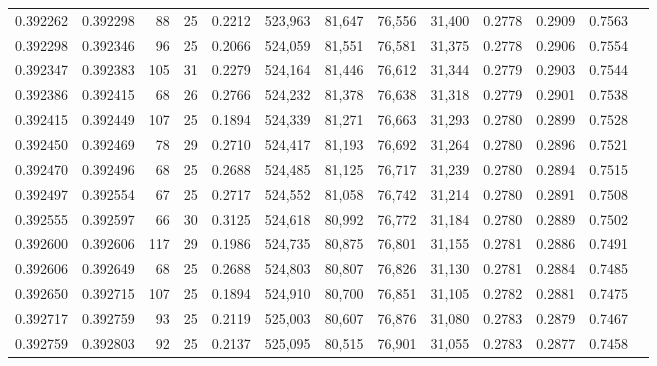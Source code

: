 \begin{tabular}{rrrrrrrrrrrrr}
0.392262 & 0.392298 &    88 &  25 &                                     0.2212 & 523,963 &  81,647 &  76,556 &  31,400 & 0.2778 & 0.2909 & 0.7563 \\
0.392298 & 0.392346 &    96 &  25 &                                     0.2066 & 524,059 &  81,551 &  76,581 &  31,375 & 0.2778 & 0.2906 & 0.7554 \\
0.392347 & 0.392383 &   105 &  31 &                                     0.2279 & 524,164 &  81,446 &  76,612 &  31,344 & 0.2779 & 0.2903 & 0.7544 \\
0.392386 & 0.392415 &    68 &  26 &                                     0.2766 & 524,232 &  81,378 &  76,638 &  31,318 & 0.2779 & 0.2901 & 0.7538 \\
0.392415 & 0.392449 &   107 &  25 &                                     0.1894 & 524,339 &  81,271 &  76,663 &  31,293 & 0.2780 & 0.2899 & 0.7528 \\
0.392450 & 0.392469 &    78 &  29 &                                     0.2710 & 524,417 &  81,193 &  76,692 &  31,264 & 0.2780 & 0.2896 & 0.7521 \\
0.392470 & 0.392496 &    68 &  25 &                                     0.2688 & 524,485 &  81,125 &  76,717 &  31,239 & 0.2780 & 0.2894 & 0.7515 \\
0.392497 & 0.392554 &    67 &  25 &                                     0.2717 & 524,552 &  81,058 &  76,742 &  31,214 & 0.2780 & 0.2891 & 0.7508 \\
0.392555 & 0.392597 &    66 &  30 &                                     0.3125 & 524,618 &  80,992 &  76,772 &  31,184 & 0.2780 & 0.2889 & 0.7502 \\
0.392600 & 0.392606 &   117 &  29 &                                     0.1986 & 524,735 &  80,875 &  76,801 &  31,155 & 0.2781 & 0.2886 & 0.7491 \\
0.392606 & 0.392649 &    68 &  25 &                                     0.2688 & 524,803 &  80,807 &  76,826 &  31,130 & 0.2781 & 0.2884 & 0.7485 \\
0.392650 & 0.392715 &   107 &  25 &                                     0.1894 & 524,910 &  80,700 &  76,851 &  31,105 & 0.2782 & 0.2881 & 0.7475 \\
0.392717 & 0.392759 &    93 &  25 &                                     0.2119 & 525,003 &  80,607 &  76,876 &  31,080 & 0.2783 & 0.2879 & 0.7467 \\
0.392759 & 0.392803 &    92 &  25 &                                     0.2137 & 525,095 &  80,515 &  76,901 &  31,055 & 0.2783 & 0.2877 & 0.7458 \\

\end{tabular}
